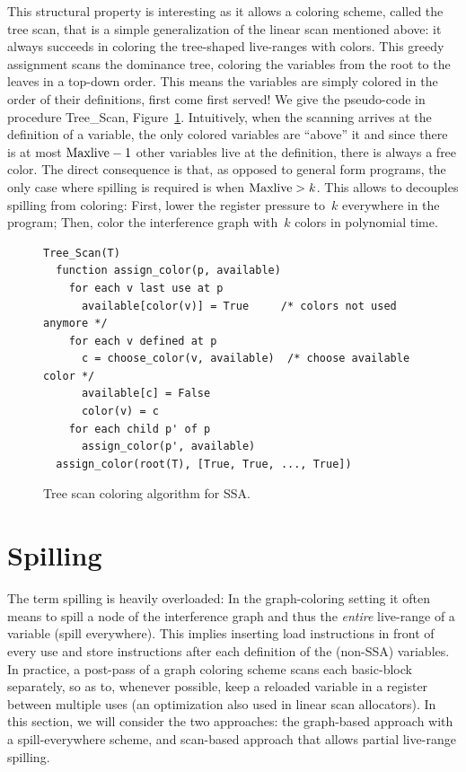 {This structural property is interesting as it allows a coloring scheme, called the tree scan, that is a simple generalization of the linear scan mentioned above: 
it always succeeds in coloring the tree-shaped live-ranges with \maxlive colors. 
This greedy assignment scans the dominance tree, coloring the variables from the root to the leaves in a top-down order. 
This means the variables are simply colored in the order of their definitions, first come first served! 
We give the pseudo-code in procedure Tree\_Scan, Figure~\ref{code:assign-tree-scan}.
Intuitively, when the scanning arrives at the definition of a variable, the only colored variables are ``above'' it and since there is at most $\mathrm{Maxlive}-1$ other variables live at the definition, there is always a free color. 
The direct consequence is that, as opposed to general form programs, the only case where spilling is required is when $\mathrm{Maxlive} > k$. 
This allows to decouples spilling from coloring: 
First, lower the register pressure to~$k$ everywhere in the program; 
Then, color the interference graph with~$k$ colors in polynomial time.


\begin{figure}
  \begin{verbatim}
Tree_Scan(T)
  function assign_color(p, available)
    for each v last use at p
      available[color(v)] = True     /* colors not used anymore */
    for each v defined at p
      c = choose_color(v, available)  /* choose available color */
      available[c] = False
      color(v) = c
    for each child p' of p
      assign_color(p', available)
  assign_color(root(T), [True, True, ..., True])

  \end{verbatim}
  \caption{Tree scan coloring algorithm for SSA.}
  \label{code:assign-tree-scan}
\end{figure}


\section{Spilling}

The term spilling is heavily overloaded:
In the graph-coloring setting it often means to spill a node of the interference graph and thus the \emph{entire} live-range of a variable (spill everywhere).
This implies inserting load instructions in front of every use and store instructions after each definition of the (non-SSA) variables.
In practice, a post-pass of a graph coloring scheme scans each basic-block separately, so as to, whenever possible, keep a reloaded variable in a register between multiple uses (an optimization also used in linear scan allocators).
In this section, we will consider the two approaches: the graph-based approach with a spill-everywhere scheme, and scan-based approach that allows partial live-range spilling.

}
